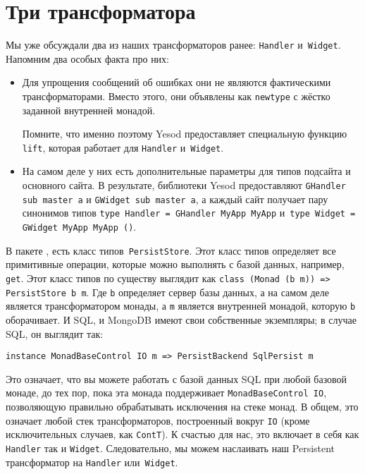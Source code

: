 \section{Три трансформатора}
Мы уже обсуждали два из наших трансформаторов ранее: \lstinline'Handler'
и~\lstinline'Widget'. Напомним два особых факта про них:
\begin{itemize}
    \item  Для упрощения сообщений об ошибках они не являются фактическими
        трансформаторами. Вместо этого, они объявлены как \lstinline'newtype' с
        жёстко заданной внутренней монадой.

        \begin{remark}
            Помните, что именно поэтому Yesod предоставляет специальную функцию
            \lstinline'lift', которая работает для \lstinline'Handler'
            и~\lstinline'Widget'.
        \end{remark}
    \item  На самом деле у них есть дополнительные параметры для типов подсайта
        и основного сайта. В результате, библиотеки Yesod предоставляют
        \lstinline'GHandler sub master a' и \lstinline'GWidget sub master a', а
        каждый сайт получает пару синонимов типов
        \lstinline'type Handler = GHandler MyApp MyApp'
        и~\lstinline'type Widget = GWidget MyApp MyApp ()'.
\end{itemize}

В пакете
, есть
класс типов~\lstinline'PersistStore'. Этот класс типов определяет все
примитивные операции, которые можно выполнять с базой данных, например,
\lstinline'get'. Этот класс типов по существу выглядит как
\lstinline'class (Monad (b m)) => PersistStore b m'. Где \lstinline'b'
определяет сервер базы данных, а на самом деле является трансформатором монады,
а \lstinline'm' является внутренней монадой, которую \lstinline'b' оборачивает.
И SQL, и MongoDB имеют свои собственные экземпляры; в случае SQL, он выглядит
так:
\begin{lstlisting}
instance MonadBaseControl IO m => PersistBackend SqlPersist m
\end{lstlisting}

Это означает, что вы можете работать с базой данных SQL при любой базовой
монаде, до тех пор, пока эта монада поддерживает \lstinline'MonadBaseControl IO',
позволяющую правильно обрабатывать исключения на стеке монад. В общем,
это означает любой стек трансформаторов, построенный вокруг \lstinline'IO'
(кроме исключительных случаев, как \lstinline'ContT'). К счастью для нас, это
включает в себя как \lstinline'Handler' так и \lstinline'Widget'. Следовательно,
мы можем наслаивать наш Persistent трансформатор на \lstinline'Handler'
или~\lstinline'Widget'.

